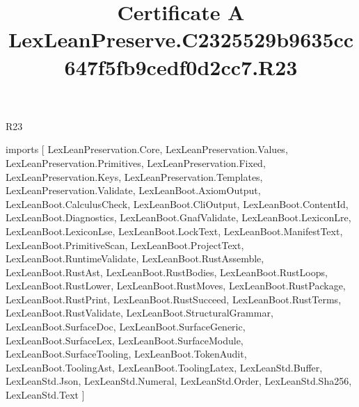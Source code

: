\begin{lexlean}{R23}
\title{Certificate A LexLeanPreserve.C2325529b9635cc647f5fb9cedf0d2cc7.R23}
\begin{coremodule}
imports [
  LexLeanPreservation.Core,
  LexLeanPreservation.Values,
  LexLeanPreservation.Primitives,
  LexLeanPreservation.Fixed,
  LexLeanPreservation.Keys,
  LexLeanPreservation.Templates,
  LexLeanPreservation.Validate,
  LexLeanBoot.AxiomOutput,
  LexLeanBoot.CalculusCheck,
  LexLeanBoot.CliOutput,
  LexLeanBoot.ContentId,
  LexLeanBoot.Diagnostics,
  LexLeanBoot.GnafValidate,
  LexLeanBoot.LexiconLre,
  LexLeanBoot.LexiconLse,
  LexLeanBoot.LockText,
  LexLeanBoot.ManifestText,
  LexLeanBoot.PrimitiveScan,
  LexLeanBoot.ProjectText,
  LexLeanBoot.RuntimeValidate,
  LexLeanBoot.RustAssemble,
  LexLeanBoot.RustAst,
  LexLeanBoot.RustBodies,
  LexLeanBoot.RustLoops,
  LexLeanBoot.RustLower,
  LexLeanBoot.RustMoves,
  LexLeanBoot.RustPackage,
  LexLeanBoot.RustPrint,
  LexLeanBoot.RustSucceed,
  LexLeanBoot.RustTerms,
  LexLeanBoot.RustValidate,
  LexLeanBoot.StructuralGrammar,
  LexLeanBoot.SurfaceDoc,
  LexLeanBoot.SurfaceGeneric,
  LexLeanBoot.SurfaceLex,
  LexLeanBoot.SurfaceModule,
  LexLeanBoot.SurfaceTooling,
  LexLeanBoot.TokenAudit,
  LexLeanBoot.ToolingAst,
  LexLeanBoot.ToolingLatex,
  LexLeanStd.Buffer,
  LexLeanStd.Json,
  LexLeanStd.Numeral,
  LexLeanStd.Order,
  LexLeanStd.Sha256,
  LexLeanStd.Text
]


\end{coremodule}
\end{lexlean}
